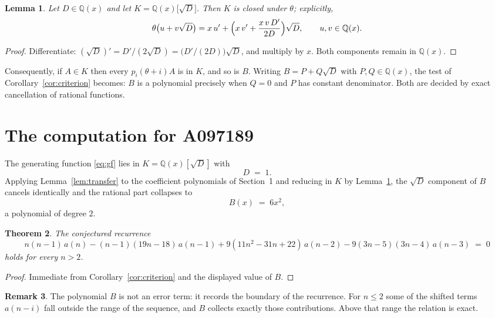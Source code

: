 \documentclass[11pt,a4paper]{article}
\theoremstyle{plain}
\newtheorem{theorem}{Theorem}
\newtheorem{lemma}[theorem]{Lemma}
\theoremstyle{definition}
\newtheorem{remark}[theorem]{Remark}
\begin{document}
\begin{lemma}\label{lem:field}
Let $D\in\mathbb{Q}(x)$ and let $K=\mathbb{Q}(x)\bigl[\sqrt{D}\bigr]$. Then $K$ is closed
under $\theta$; explicitly,
\[
\theta\bigl(u+v\sqrt{D}\bigr)=x\,u'+\Bigl(x\,v'+\frac{x\,v\,D'}{2D}\Bigr)\sqrt{D},
\qquad u,v\in\mathbb{Q}(x).
\]
\end{lemma}

\begin{proof}
Differentiate: $(\sqrt{D})'=D'/(2\sqrt{D})=\bigl(D'/(2D)\bigr)\sqrt{D}$, and multiply by
$x$. Both components remain in $\mathbb{Q}(x)$.
\end{proof}

Consequently, if $A\in K$ then every $p_{i}(\theta+i)A$ is in $K$, and so is $B$. Writing
$B=P+Q\sqrt{D}$ with $P,Q\in\mathbb{Q}(x)$, the test of Corollary~\ref{cor:criterion}
becomes: $B$ is a polynomial precisely when $Q=0$ and $P$ has constant denominator. Both
are decided by exact cancellation of rational functions.

\section{The computation for A097189}

The generating function \eqref{eq:gf} lies in $K=\mathbb{Q}(x)[\sqrt{D}]$ with
\[
D \;=\; 1 .
\]
Applying Lemma~\ref{lem:transfer} to the coefficient polynomials of Section~1 and reducing
in $K$ by Lemma~\ref{lem:field}, the $\sqrt{D}$ component of $B$ cancels identically and
the rational part collapses to
\[
B(x)\;=\;6 x^{2} ,
\]
a polynomial of degree $2$.

\begin{theorem}
The conjectured recurrence
\[
n \left(n - 1\right)\,a(n) -  \left(n - 1\right) \left(19 n - 18\right)\,a(n-1) + 9 \left(11 n^{2} - 31 n + 22\right)\,a(n-2) -  9 \left(3 n - 5\right) \left(3 n - 4\right)\,a(n-3) \;=\;0
\]
holds for every $n>2$.
\end{theorem}

\begin{proof}
Immediate from Corollary~\ref{cor:criterion} and the displayed value of $B$.
\end{proof}

\begin{remark}
The polynomial $B$ is not an error term: it records the boundary of the recurrence. For
$n\le2$ some of the shifted terms $a(n-i)$ fall outside the range of the sequence,
and $B$ collects exactly those contributions. Above that range the relation is exact.
\end{remark}
\end{document}
